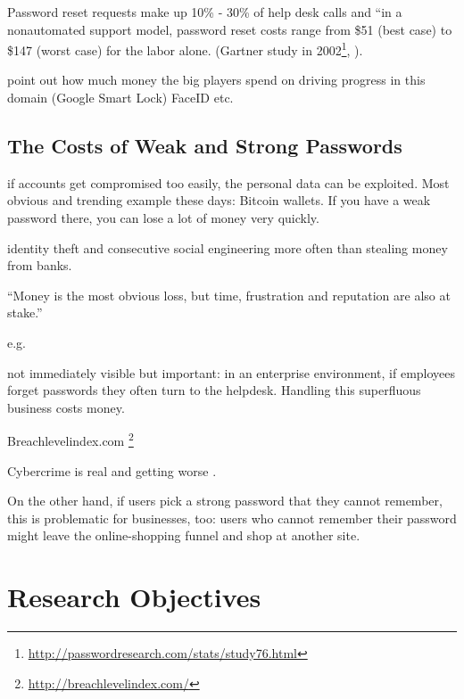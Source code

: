 Password reset requests make up 10\% - 30\% of help desk calls and ``in a nonautomated support model, password reset costs range from \$51 (best case) to \$147 (worst case) for the labor alone. (Gartner study in 2002\footnote{\url{http://passwordresearch.com/stats/study76.html}}, ).


point out how much money the big players spend on driving progress in this domain (Google Smart Lock) FaceID etc. 

\subsection{The Costs of Weak and Strong Passwords}

if accounts get compromised too easily, the personal data can be exploited. Most obvious and trending example these days: Bitcoin wallets. If you have a weak password there, you can lose a lot of money very quickly.

identity theft and consecutive social engineering more often than stealing money from banks.

``Money is the most obvious loss, but time, frustration and reputation are also at stake.'' \cite{Herley2012PersistenceOfPasswords}

 e.g. \cite{CSID2012PasswordHabits} 

not immediately visible but important: in an enterprise environment, if employees forget passwords they often turn to the helpdesk. Handling this superfluous business costs money. 

Breachlevelindex.com \footnote{\label{foot:rw:breachlevelindex}\url{http://breachlevelindex.com/}}

Cybercrime is real and getting worse \cite{BKA2016Bundeslagebild}.

On the other hand, if users pick a strong password that they cannot remember, this is problematic for businesses, too: users who cannot remember their password might leave the online-shopping funnel and shop at another site.

\section{Research Objectives}\label{sec:intro:researchobjectives}



